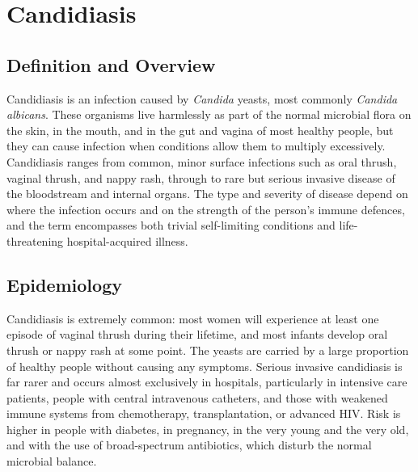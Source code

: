 \chapter{Candidiasis}

\section*{Definition and Overview}
Candidiasis is an infection caused by \textit{Candida} yeasts, most commonly \textit{Candida albicans}. These organisms live harmlessly as part of the normal microbial flora on the skin, in the mouth, and in the gut and vagina of most healthy people, but they can cause infection when conditions allow them to multiply excessively. Candidiasis ranges from common, minor surface infections such as oral thrush, vaginal thrush, and nappy rash, through to rare but serious invasive disease of the bloodstream and internal organs. The type and severity of disease depend on where the infection occurs and on the strength of the person's immune defences, and the term encompasses both trivial self-limiting conditions and life-threatening hospital-acquired illness.

\section*{Epidemiology}
Candidiasis is extremely common: most women will experience at least one episode of vaginal thrush during their lifetime, and most infants develop oral thrush or nappy rash at some point. The yeasts are carried by a large proportion of healthy people without causing any symptoms. Serious invasive candidiasis is far rarer and occurs almost exclusively in hospitals, particularly in intensive care patients, people with central intravenous catheters, and those with weakened immune systems from chemotherapy, transplantation, or advanced HIV. Risk is higher in people with diabetes, in pregnancy, in the very young and the very old, and with the use of broad-spectrum antibiotics, which disturb the normal microbial balance.


